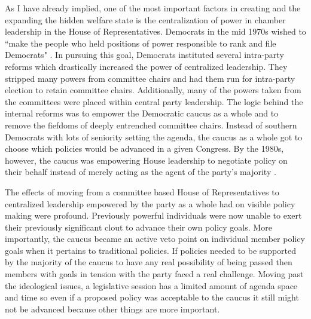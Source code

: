 \documentclass[12pt]{article}
\begin{document}
As I have already implied, one of the most important factors in creating and the expanding the hidden welfare state is the centralization of power in chamber leadership in the House of Representatives. Democrats in the mid 1970s wished to ``make the people who held positions of power responsible to rank and file Democrats" \citep[pg. 26, quote spoken by Rep. Donald Fraser (D-MN)]{rohde1991}. In pursuing this goal, Democrats instituted several intra-party reforms which drastically increased the power of centralized leadership. They stripped many powers from committee chairs and had them run for intra-party election to retain committee chairs. Additionally, many of the powers taken from the committees were placed within central party leadership. The logic behind the internal reforms was to empower the Democratic caucus as a whole and to remove the fiefdoms of deeply entrenched committee chairs. Instead of southern Democrats with lots of seniority setting the agenda, the caucus as a whole got to choose which policies would be advanced in a given Congress. By the 1980s, however, the caucus was empowering House leadership to negotiate policy on their behalf instead of merely acting as the agent of the party's majority \citep{sinclair1983, palazzolo1992, sinclair1998}.

The effects of moving from a committee based House of Representatives to centralized leadership empowered by the party as a whole had on visible policy making were profound. Previously powerful individuals were now unable to exert their previously significant clout to advance their own policy goals. More importantly, the caucus became an active veto point on individual member policy goals when it pertains to traditional policies. If policies needed to be supported by the majority of the caucus to have any real possibility of being passed then members with goals in tension with the party faced a real challenge. Moving past the ideological issues, a legislative session has a limited amount of agenda space and time so even if a proposed policy was acceptable to the caucus it still might not be advanced because other things are more important.
\end{document}
